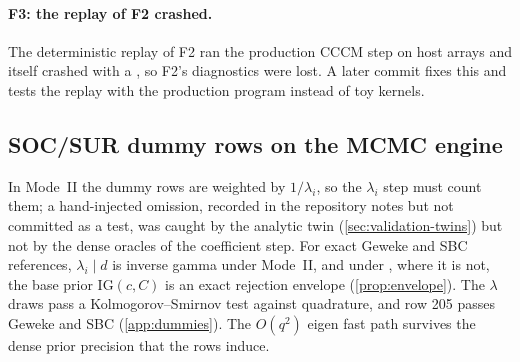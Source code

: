 \paragraph{F3: the replay of F2 crashed.}\label{sec:robustness-f3}
The deterministic replay of F2 ran the production CCCM step on host arrays and itself crashed with a , so F2's diagnostics were lost. %
A later commit fixes this and tests the replay with the production program instead of toy kernels. %

\subsection{SOC/SUR dummy rows on the MCMC engine}\label{sec:robustness-dummies}

In Mode~II the dummy rows are weighted by $1/\lambda_i$, so the $\lambda_i$ step must count them; a hand-injected omission, recorded in the repository notes but not committed as a test, was caught by the analytic twin (\cref{sec:validation-twins}) but not by the dense oracles of the coefficient step. %
For exact Geweke and SBC references, $\lambda_i \mid d$ is inverse gamma under Mode~II, and under , where it is not, the base prior $\mathrm{IG}(c, C)$ is an exact rejection envelope (\cref{prop:envelope}). %
The $\lambda$ draws pass a Kolmogorov--Smirnov test against quadrature, and row 205 passes Geweke and SBC (\cref{app:dummies}). %
The $O(q^2)$ eigen fast path survives the dense prior precision that the rows induce. %

